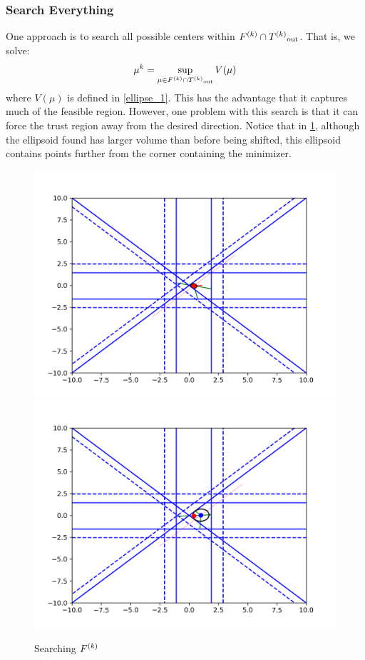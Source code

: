 \subsubsection{Search Everything}

One approach is to search all possible centers within $ {F}^{(k)} \cap {T^{(k)}}_{\text{out}} $.
That is, we solve:
$$\mu^k = \sup_{\mu \in {F}^{(k)} \cap {T^{(k)}}_{\text{out}}} V(\mu)$$
where $V(\mu)$ is defined in \cref{ellipse_1}.
This has the advantage that it captures much of the feasible region.
However, one problem with this search is that it can force the trust region away from the desired direction.
Notice that in \cref{ellipse_runs_away}, although the ellipsoid found has larger volume than before being shifted, this ellipsoid contains points further from the corner containing the minimizer.

\begin{figure}[h]
    \centering
    \includegraphics[scale=0.4]{images/everything_runs_1.png}
    \includegraphics[scale=0.4]{images/everything_runs_2.png}
    \caption{Searching ${F}^{(k)}$}
    \label{ellipse_runs_away}
\end{figure}



